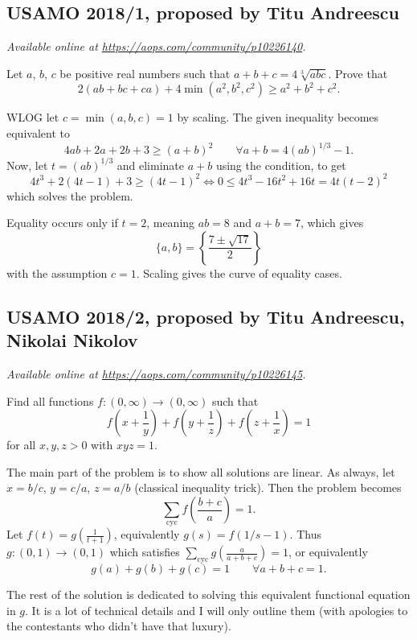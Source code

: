 \documentclass[11pt]{scrartcl}
\begin{document}
\subsection{USAMO 2018/1, proposed by Titu Andreescu}
\textsl{Available online at \url{https://aops.com/community/p10226140}.}
\begin{mdframed}[style=mdpurplebox,frametitle={Problem statement}]
Let $a$, $b$, $c$ be positive real numbers such that $a+b+c = 4\sqrt[3]{abc}$.
Prove that
\[ 2(ab+bc+ca) + 4 \min (a^2, b^2, c^2) \ge a^2 + b^2 + c^2. \]
\end{mdframed}
WLOG let $c = \min(a,b,c) = 1$ by scaling.
The given inequality becomes equivalent to
\[ 4ab + 2a + 2b + 3 \ge (a+b)^2 \qquad \forall a+b = 4(ab)^{1/3}-1. \]
Now, let $t = (ab)^{1/3}$ and eliminate $a+b$ using the condition, to get
\[ 4t^3 + 2(4t-1) + 3 \ge (4t-1)^2
  \iff 0 \le 4t^3 - 16t^2 + 16t = 4t(t-2)^2 \]
which solves the problem.

Equality occurs only if $t=2$,
meaning $ab = 8$ and $a+b=7$, which gives
\[ \{a,b\} = \left\{ \frac{7 \pm \sqrt{17}}{2} \right\} \]
with the assumption $c = 1$.
Scaling gives the curve of equality cases.
\pagebreak

\subsection{USAMO 2018/2, proposed by Titu Andreescu, Nikolai Nikolov}
\textsl{Available online at \url{https://aops.com/community/p10226145}.}
\begin{mdframed}[style=mdpurplebox,frametitle={Problem statement}]
Find all functions $f \colon (0,\infty) \to (0,\infty)$ such that
\[
  f\left( x+\frac 1y \right)
  + f\left( y+\frac 1z \right)
  + f\left( z+\frac 1x \right)
  = 1
\]
for all $x,y,z > 0$ with $xyz = 1$.
\end{mdframed}
The main part of the problem is to show all solutions are linear.
As always, let $x=b/c$, $y=c/a$, $z=a/b$
(classical inequality trick).
Then the problem becomes
\[ \sum_{\text{cyc}} f\left( \frac{b+c}{a} \right) = 1. \]
Let $f(t) = g(\frac{1}{t+1})$,
equivalently $g(s) = f(1/s-1)$.
Thus $g \colon (0,1) \to (0,1)$
which satisfies $\sum_{\text{cyc}} g\left( \frac{a}{a+b+c} \right) = 1$,
or equivalently
\[ \boxed{g(a) + g(b) + g(c) = 1} \qquad \forall a+b+c=1. \]

The rest of the solution is dedicated to solving this
equivalent functional equation in $g$.
It is a lot of technical details and I will only outline them
(with apologies to the contestants who didn't have that luxury).
\end{document}
